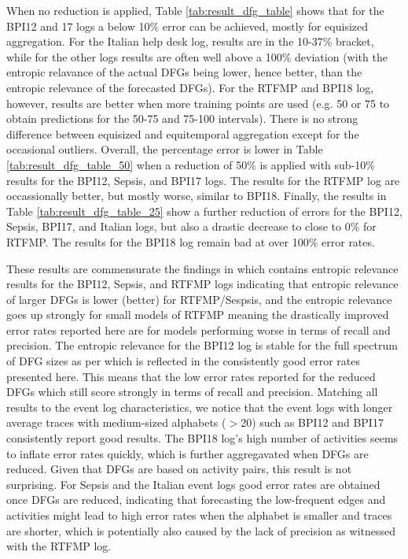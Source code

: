When no reduction is applied, Table \ref{tab:result_dfg_table} shows that for the BPI12 and 17 logs a below 10\% error can be achieved, mostly for equisized aggregation. 
For the Italian help desk log, results are in the 10-37\% bracket, while for the other logs results are often well above a 100\% deviation (with the entropic relavance of the actual DFGs being lower, hence better, than the entropic relevance of the forecasted DFGs).
For the RTFMP and BPI18 log, however, results are better when more training points are used (e.g. 50 or 75 to obtain predictions for the 50-75 and 75-100 intervals).
There is no strong difference between equisized and equitemporal aggregation except for the occasional outliers.
Overall, the percentage error is lower in Table \ref{tab:result_dfg_table_50} when a reduction of 50\% is applied with sub-10\% results for the BPI12, Sepsis, and BPI17 logs. 
The results for the RTFMP log are occassionally better, but mostly worse, similar to BPI18.
Finally, the results in Table \ref{tab:result_dfg_table_25} show a further reduction of errors for the BPI12, Sepsis, BPI17, and Italian logs, but also a drastic decrease to close to 0\% for RTFMP.
The results for the BPI18 log remain bad at over 100\% error rates.

These results are commensurate the findings in \cite{DBLP:conf/icpm/PolyvyanyyMG20} which contains entropic relevance results for the BPI12, Sepsis, and RTFMP logs indicating that entropic relevance of larger DFGs is lower (better) for RTFMP/Sespsis, and the entropic relevance goes up strongly for small models of RTFMP meaning the drastically improved error rates reported here are for models performing worse in terms of recall and precision.
The entropic relevance for the BPI12 log is stable for the full spectrum of DFG sizes as per \cite{DBLP:conf/icpm/PolyvyanyyMG20} which is reflected in the consistently good error rates presented here.
This means that the low error rates reported for the reduced DFGs which still score strongly in terms of recall and precision.
Matching all results to the event log characteristics, we notice that the event logs with longer average traces with medium-sized alphabets ($>$20) such as BPI12 and BPI17 consistently report good results.
The BPI18 log's high number of activities seems to inflate error rates quickly, which is further aggregavated when DFGs are reduced.
Given that DFGs are based on activity pairs, this result is not surprising.
For Sepsis and the Italian event logs good error rates are obtained once DFGs are reduced, indicating that forecasting the low-frequent edges and activities might lead to high error rates when the alphabet is smaller and traces are shorter, which is potentially also caused by the lack of precision as witnessed with the RTFMP log.

